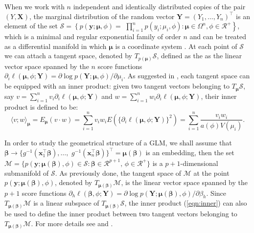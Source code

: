 When we work with $n$ independent and identically distributed copies of the pair $(Y, \bm{X})$, the marginal distribution of the random vector $\bm{Y}=(Y_1,\ldots,Y_n)^\top$ is an element of the set $\mathcal{S} = \left\{p(\bm{y};\boldsymbol{\mu},\phi) = \right. $ $\left.  \prod_{i=1}^{n} p(y_i;\mu_i,\phi) : \boldsymbol{\mu} \in \Omega^n , \phi \in \mathcal{R}^+ \right\}$, which is a minimal and regular exponential family of order $n$ and can be treated as a differential manifold in which $\boldsymbol{\mu}$ is a coordinate system \citep{Amari85}. At each point of $\mathcal S$ we can attach a tangent space, denoted by $T_{p(\boldsymbol{\mu})}\mathcal{S}$, defined as the as the linear vector space spanned by the $n$ score functions $\partial_i \ell(\boldsymbol{\mu},\phi;\bm{Y}) = \partial\log p(\bm{Y}; \boldsymbol{\mu},\phi)/\partial{\mu}_i$. As suggested in \cite{BurbeaEtAl_JMA_82}, each tangent space can be equipped with an inner product: given two tangent vectors belonging to $T_{\bm{\mu}}\mathcal{S}$, say $v = \sum_{i=1}^n v_i\partial_i \ell(\boldsymbol{\mu},\phi;\bm{Y})$ and $w = \sum_{i=1}^n w_i\partial_i \ell(\boldsymbol{\mu},\phi;\bm{Y})$, their inner product is defined to be:
%
\begin{equation}\label{eqn:inner}
\langle v; w \rangle_{\bm{\mu}} = E_{\bm\mu}(v\cdot w) = \sum_{i=1}^n v_ iw_i E(\{\partial_i \ell(\boldsymbol{\mu},\phi;\bm{Y})\}^2) = \sum_{i=1}^n\frac{v_iw_i}{a(\phi) V(\mu_i)}.
\end{equation}

In order to study the geometrical structure of a GLM, we shall assume that $\boldsymbol{\beta} \rightarrow \{ g^{-1}( \bm{x}_1^\top\boldsymbol{\beta}),\ldots,$ $  g^{-1}( \bm{x}_n^\top\boldsymbol{\beta}) \}^\top = \boldsymbol{\mu}(\boldsymbol{\beta})$ is an embedding, then the set $\mathcal{M}=\{p(\bm{y}; \boldsymbol{\mu}(\boldsymbol{\beta}),\phi) \in \mathcal{S} : \boldsymbol{\beta} \in \mathcal{R}^{p+1}, \, \phi \in \mathcal{R}^+ \}
\label{eq:M}
$ is a $p+1$-dimensional submanifold of $\mathcal{S}$. As previously done, the tangent space of $\mathcal{M}$ at the point $p(\bm{y}; \boldsymbol{\mu}(\boldsymbol{\beta}),\phi)$, denoted by $T_{\boldsymbol{\mu}(\boldsymbol{\beta})}\mathcal{M}$, is the linear vector space spanned by the $p+1$ score functions $\partial_h \ell(\boldsymbol{\beta},\phi;\bm{Y}) = \partial\log p(\bm{Y}; \boldsymbol{\mu}(\boldsymbol{\beta}),\phi)/\partial{\beta}_h$. Since $T_{\boldsymbol{\mu}(\boldsymbol{\beta})}\mathcal{M}$ is a linear subspace of $T_{\boldsymbol{\mu}(\boldsymbol{\beta})}\mathcal{S}$, the inner product (\ref{eqn:inner}) can also be used to define the inner product between two tangent vectors belonging to $T_{\boldsymbol{\mu}(\boldsymbol{\beta})}\mathcal{M}$. For more details see \cite{Augug13} and \cite{pazira_0}.

